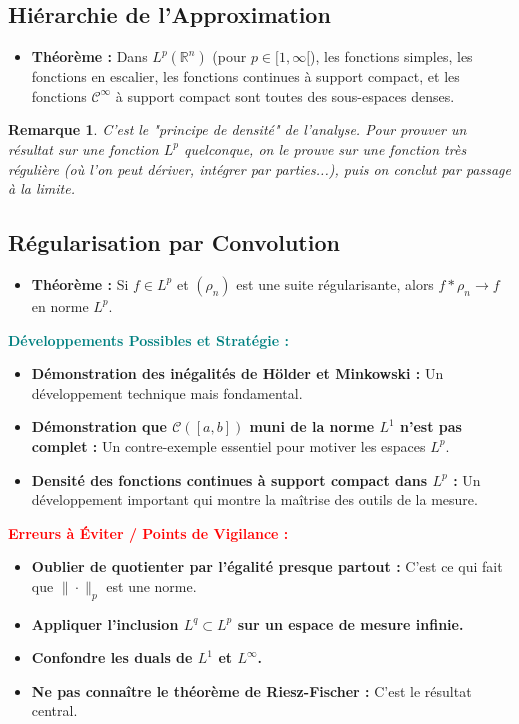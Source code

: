 \documentclass[12pt, a4paper, parskip=full]{report}
\theoremstyle{agregstyle}
\newtheorem{remark}[definition]{Remarque}
\newenvironment{developpements}
  {\par\medskip\noindent\begin{oframed}\noindent\textbf{\textcolor{teal}{Développements Possibles et Stratégie :}}}
  {\end{oframed}\par\medskip}
\newenvironment{erreurs}
  {\par\medskip\noindent\begin{oframed}\noindent\textbf{\textcolor{red}{Erreurs à Éviter / Points de Vigilance :}}}
  {\end{oframed}\par\medskip}
\begin{document}
\subsection{Hiérarchie de l'Approximation}
\begin{itemize}
    \item \textbf{Théorème :} Dans $L^p(\mathbb{R}^n)$ (pour $p \in [1, \infty[$), les fonctions simples, les fonctions en escalier, les fonctions continues à support compact, et les fonctions $\mathcal{C}^\infty$ à support compact sont toutes des sous-espaces denses.
\end{itemize}
\begin{remark}
    C'est le "principe de densité" de l'analyse. Pour prouver un résultat sur une fonction $L^p$ quelconque, on le prouve sur une fonction très régulière (où l'on peut dériver, intégrer par parties...), puis on conclut par passage à la limite.
\end{remark}
\subsection{Régularisation par Convolution}
\begin{itemize}
    \item \textbf{Théorème :} Si $f \in L^p$ et $(\rho_n)$ est une suite régularisante, alors $f * \rho_n \to f$ en norme $L^p$.
\end{itemize}

\begin{developpements}
    \begin{itemize}
        \item \textbf{Démonstration des inégalités de Hölder et Minkowski :} Un développement technique mais fondamental.
        \item \textbf{Démonstration que $\mathcal{C}([a,b])$ muni de la norme $L^1$ n'est pas complet :} Un contre-exemple essentiel pour motiver les espaces $L^p$.
        \item \textbf{Densité des fonctions continues à support compact dans $L^p$ :} Un développement important qui montre la maîtrise des outils de la mesure.
    \end{itemize}
\end{developpements}

\begin{erreurs}
    \begin{itemize}
        \item \textbf{Oublier de quotienter par l'égalité presque partout :} C'est ce qui fait que $\|\cdot\|_p$ est une norme.
        \item \textbf{Appliquer l'inclusion $L^q \subset L^p$ sur un espace de mesure infinie.}
        \item \textbf{Confondre les duals de $L^1$ et $L^\infty$.}
        \item \textbf{Ne pas connaître le théorème de Riesz-Fischer :} C'est le résultat central.
    \end{itemize}
\end{erreurs}
\end{document}
